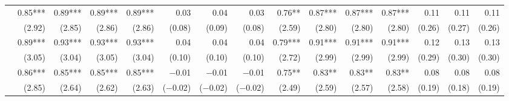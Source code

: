 \begin{tabularx}{1.45\textwidth}{lRRRRRRRRRRRRRR}
		 & \num{0.85}***\phantom{)} & \num{0.89}***\phantom{)} & \num{0.89}***\phantom{)} & \num{0.89}***\phantom{)} & \num{0.03}\phantom{***)} & \num{0.04}\phantom{***)} & \num{0.03}\phantom{***)} & \num{0.76}**\phantom{*)} & \num{0.87}***\phantom{)} & \num{0.87}***\phantom{)} & \num{0.87}***\phantom{)} & \num{0.11}\phantom{***)} & \num{0.11}\phantom{***)} & \num{0.11}\phantom{***)} \\
		 & (\num{2.92})\phantom{***} & (\num{2.85})\phantom{***} & (\num{2.86})\phantom{***} & (\num{2.86})\phantom{***} & (\num{0.08})\phantom{***} & (\num{0.09})\phantom{***} & (\num{0.08})\phantom{***} & (\num{2.59})\phantom{***} & (\num{2.80})\phantom{***} & (\num{2.80})\phantom{***} & (\num{2.80})\phantom{***} & (\num{0.26})\phantom{***} & (\num{0.27})\phantom{***} & (\num{0.26})\phantom{***} \\ [\dspacing]
		 & \num{0.89}***\phantom{)} & \num{0.93}***\phantom{)} & \num{0.93}***\phantom{)} & \num{0.93}***\phantom{)} & \num{0.04}\phantom{***)} & \num{0.04}\phantom{***)} & \num{0.04}\phantom{***)} & \num{0.79}***\phantom{)} & \num{0.91}***\phantom{)} & \num{0.91}***\phantom{)} & \num{0.91}***\phantom{)} & \num{0.12}\phantom{***)} & \num{0.13}\phantom{***)} & \num{0.13}\phantom{***)} \\
		 & (\num{3.05})\phantom{***} & (\num{3.04})\phantom{***} & (\num{3.05})\phantom{***} & (\num{3.04})\phantom{***} & (\num{0.10})\phantom{***} & (\num{0.10})\phantom{***} & (\num{0.10})\phantom{***} & (\num{2.72})\phantom{***} & (\num{2.99})\phantom{***} & (\num{2.99})\phantom{***} & (\num{2.99})\phantom{***} & (\num{0.29})\phantom{***} & (\num{0.30})\phantom{***} & (\num{0.30})\phantom{***} \\ [\dspacing]
		 & \num{0.86}***\phantom{)} & \num{0.85}***\phantom{)} & \num{0.85}***\phantom{)} & \num{0.85}***\phantom{)} & \num{-0.01}\phantom{***)} & \num{-0.01}\phantom{***)} & \num{-0.01}\phantom{***)} & \num{0.75}**\phantom{*)} & \num{0.83}**\phantom{*)} & \num{0.83}**\phantom{*)} & \num{0.83}**\phantom{*)} & \num{0.08}\phantom{***)} & \num{0.08}\phantom{***)} & \num{0.08}\phantom{***)} \\
		 & (\num{2.85})\phantom{***} & (\num{2.64})\phantom{***} & (\num{2.62})\phantom{***} & (\num{2.63})\phantom{***} & (\num{-0.02})\phantom{***} & (\num{-0.02})\phantom{***} & (\num{-0.02})\phantom{***} & (\num{2.49})\phantom{***} & (\num{2.59})\phantom{***} & (\num{2.57})\phantom{***} & (\num{2.58})\phantom{***} & (\num{0.19})\phantom{***} & (\num{0.18})\phantom{***} & (\num{0.19})\phantom{***} \\ [\dspacing]

\end{tabularx}
